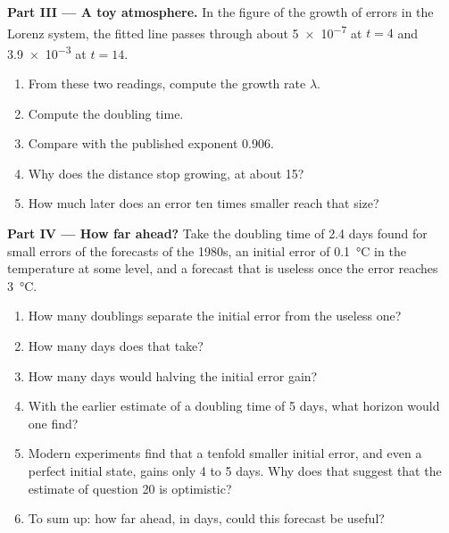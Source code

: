 \begin{problem}
\medskip\noindent\textbf{Part III --- A toy atmosphere.}
In the figure of the growth of errors in the Lorenz system, the fitted line passes through
about \num{5e-7} at $t = 4$ and \num{3.9e-3} at $t = 14$.
\begin{enumerate}[resume]
  \item From these two readings, compute the growth rate $\lambda$.
  \item Compute the doubling time.
  \item Compare with the published exponent 0.906.
  \item Why does the distance stop growing, at about 15?
  \item How much later does an error ten times smaller reach that size?
\end{enumerate}

\medskip\noindent\textbf{Part IV --- How far ahead?}
Take the doubling time of 2.4 days found for small errors of the forecasts of the 1980s, an
initial error of \qty{0.1}{\celsius} in the temperature at some level, and a forecast that is
useless once the error reaches \qty{3}{\celsius}.
\begin{enumerate}[resume]
  \item How many doublings separate the initial error from the useless one?
  \item How many days does that take?
  \item How many days would halving the initial error gain?
  \item With the earlier estimate of a doubling time of 5 days, what horizon would one find?
  \item Modern experiments find that a tenfold smaller initial error, and even a perfect
        initial state, gains only 4 to 5 days. Why does that suggest that the estimate of
        question 20 is optimistic?
  \item To sum up: how far ahead, in days, could this forecast be useful?
\end{enumerate}
\end{problem}
